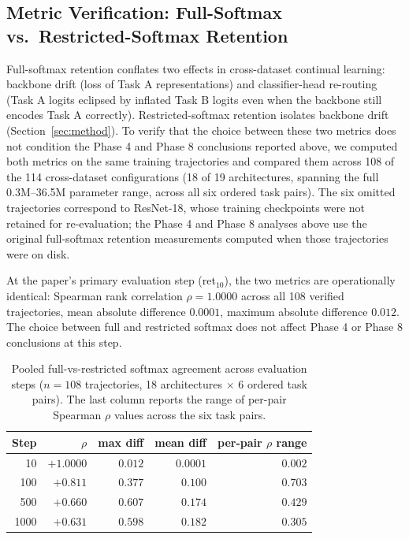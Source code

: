 \documentclass[10pt,twocolumn]{article}
\begin{document}
\subsection{Metric Verification: Full-Softmax vs.\ Restricted-Softmax Retention}
\label{sec:metric_verification}

Full-softmax retention conflates two effects in cross-dataset continual learning: backbone drift (loss of Task A representations) and classifier-head re-routing (Task A logits eclipsed by inflated Task B logits even when the backbone still encodes Task A correctly). Restricted-softmax retention isolates backbone drift (Section~\ref{sec:method}). To verify that the choice between these two metrics does not condition the Phase 4 and Phase 8 conclusions reported above, we computed both metrics on the same training trajectories and compared them across 108 of the 114 cross-dataset configurations (18 of 19 architectures, spanning the full 0.3M--36.5M parameter range, across all six ordered task pairs). The six omitted trajectories correspond to ResNet-18, whose training checkpoints were not retained for re-evaluation; the Phase 4 and Phase 8 analyses above use the original full-softmax retention measurements computed when those trajectories were on disk.

At the paper's primary evaluation step (ret$_{10}$), the two metrics are operationally identical: Spearman rank correlation $\rho = 1.0000$ across all 108 verified trajectories, mean absolute difference $0.0001$, maximum absolute difference $0.012$. The choice between full and restricted softmax does not affect Phase 4 or Phase 8 conclusions at this step.

\begin{table}[t]
\centering
\caption{Pooled full-vs-restricted softmax agreement across evaluation steps ($n = 108$ trajectories, 18 architectures $\times$ 6 ordered task pairs). The last column reports the range of per-pair Spearman $\rho$ values across the six task pairs.}
\label{tab:metric_verification}
\small
\setlength{\tabcolsep}{4pt}
\begin{tabular}{@{}rrrrr@{}}
\toprule
Step & $\rho$ & max diff & mean diff & per-pair $\rho$ range \\
\midrule
10   & $+1.0000$ & $0.012$ & $0.0001$ & $0.002$ \\
100  & $+0.811$  & $0.377$ & $0.100$  & $0.703$ \\
500  & $+0.660$  & $0.607$ & $0.174$  & $0.429$ \\
1000 & $+0.631$  & $0.598$ & $0.182$  & $0.305$ \\
\bottomrule
\end{tabular}
\end{table}
\end{document}
